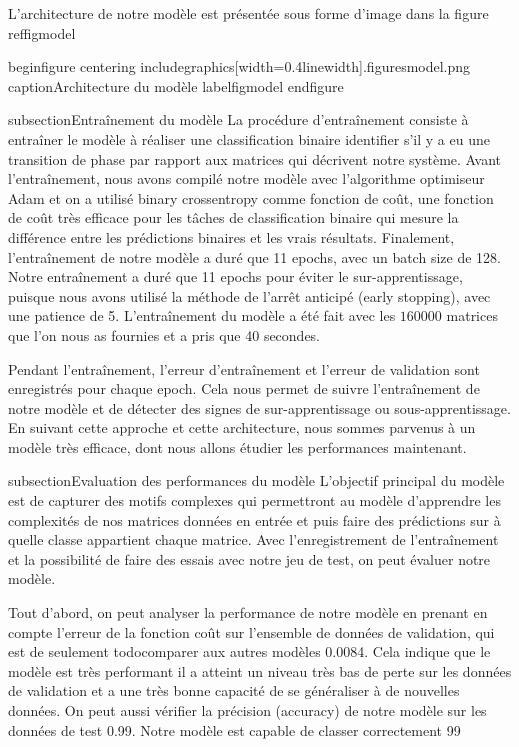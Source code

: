 L’architecture de notre modèle est présentée sous forme d’image dans la figure ref{figmodel}

begin{figure}
	centering
	includegraphics[width=0.4linewidth]{.figuresmodel.png}
	caption{Architecture du modèle}
	label{figmodel}
end{figure}

subsection{Entraînement du modèle}
La procédure d’entraînement consiste à entraîner le modèle à réaliser une classification binaire  identifier s’il y a eu une transition de phase par rapport aux matrices qui décrivent notre système. Avant l’entraînement, nous avons compilé notre modèle avec l’algorithme optimiseur Adam et on a utilisé binary crossentropy comme fonction de coût, une fonction de coût très efficace pour les tâches de classification binaire qui mesure la différence entre les prédictions binaires et les vrais résultats. Finalement, l’entraînement de notre modèle a duré que 11 epochs, avec un batch size de 128. Notre entraînement a duré que 11 epochs pour éviter le sur-apprentissage, puisque nous avons utilisé la méthode de l’arrêt anticipé (early stopping), avec une patience de 5. L’entraînement du modèle a été fait avec les $160  000$ matrices que l'on nous as fournies et a pris que 40 secondes.

Pendant l’entraînement, l’erreur d’entraînement et l’erreur de validation sont enregistrés pour chaque epoch. Cela nous permet de suivre l’entraînement de notre modèle et de détecter des signes de sur-apprentissage ou sous-apprentissage. En suivant cette approche et cette architecture, nous sommes parvenus à un modèle très efficace, dont nous allons étudier les performances maintenant.

subsection{Evaluation des performances du modèle}
L’objectif principal du modèle est de capturer des motifs complexes qui permettront au modèle d’apprendre les complexités de nos matrices données en entrée et puis faire des prédictions sur à quelle classe appartient chaque matrice. Avec l’enregistrement de l’entraînement et la possibilité de faire des essais avec notre jeu de test, on peut évaluer notre modèle.

Tout d’abord, on peut analyser la performance de notre modèle en prenant en compte l’erreur de la fonction coût sur l’ensemble de données de validation, qui est de seulement todo{comparer aux autres modèles} 0.0084. Cela indique que le modèle est très performant  il a atteint un niveau très bas de perte sur les données de validation et a une très bonne capacité de se généraliser à de nouvelles données. On peut aussi vérifier la précision (accuracy) de notre modèle sur les données de test  0.99. Notre modèle est capable de classer correctement 99%

